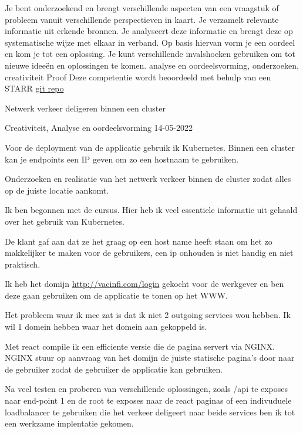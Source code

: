 \competentie
{%
	\competentieformulier
	{%
		Je bent onderzoekend en brengt verschillende
		aspecten van een vraagstuk of probleem vanuit
		verschillende perspectieven in kaart. Je verzamelt
		relevante informatie uit erkende bronnen. Je
		analyseert deze informatie en brengt deze op
		systematische wijze met elkaar in verband. Op basis
		hiervan vorm je een oordeel en kom je tot een
		oplossing. Je kunt verschillende invalshoeken
		gebruiken om tot nieuwe ideeën en oplossingen te
		komen.
	}
	{%
		analyse en
		oordeelsvorming,
		onderzoeken,
		creativiteit
	}
	{%
		Proof
	}
	{%
		Deze competentie wordt beoordeeld met behulp van een STARR
	}
	{%
		\href{https://github.com/aladante/product_inventaris}{git repo}
	}
}
{%
	\bewijs
	{%
		Netwerk verkeer deligeren binnen een cluster
	}
	{%
		\starr
		{%
			Creativiteit,
			Analyse en
			oordeelsvorming
		}
		{%
			14-05-2022
		}
		{%
			Voor de deployment van de applicatie gebruik ik Kubernetes.
			Binnen een cluster kan je endpoints een IP geven om zo een hostnaam te gebruiken.

		}
		{%
			Onderzoeken en realisatie van het netwerk verkeer binnen de cluster zodat alles op de juiste locatie aankomt.
		}
		{%
			Ik ben begonnen met de cursus. Hier heb ik veel essentiele informatie uit gehaald over het gebruik van Kubernetes.

			De klant gaf aan dat ze het graag op een host name heeft staan om het zo makkelijker te maken voor de gebruikers, een ip onhouden is niet handig en niet praktisch.

			Ik heb het domijn \href{http://vacinfi.com/login}{http://vacinfi.com/login} gekocht voor de werkgever en ben deze gaan gebruiken om de applicatie te tonen op het WWW.

			Het probleem waar ik mee zat is dat ik niet 2 outgoing services wou hebben.
			Ik wil 1 domein hebben waar het domein aan gekoppeld is.

			Met react compile ik een efficiente versie die de pagina servert via NGINX.
			NGINX stuur op aanvraag van het domijn de juiste statische pagina's door naar de gebruiker zodat de gebruiker de applicatie kan gebruiken.

			Na veel testen en proberen van verschillende oplossingen, zoals /api te exposes naar end-point 1 en de root te exposes naar de react paginas of een indivuduele loadbalancer te gebruiken die het verkeer deligeert naar beide services ben ik tot een werkzame implentatie gekomen.

}}}
